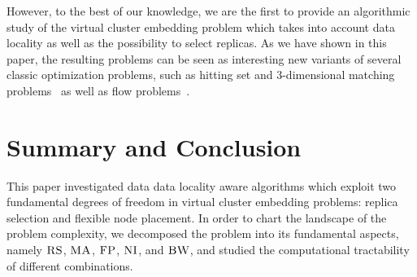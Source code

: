 \documentclass[9pt]{sigcomm-alternate}
\newcommand{\CC}{\textsc{NI}}
\newcommand{\FP}{\textsc{FP}}
\newcommand{\RS}{\textsc{RS}}
\newcommand{\BW}{\textsc{BW}}
\newcommand{\MA}{\textsc{MA}}
\begin{document}
However, to the best of our knowledge, we are the first to provide an algorithmic
study of the virtual cluster embedding problem which takes into account
data locality as well as the possibility to select replicas. As we have shown in this paper,
the resulting problems can be seen as interesting new variants of several classic optimization
problems, such as hitting set and 3-dimensional matching problems~\cite{3SC-hard} as well as flow problems~\cite{korte2002combinatorial}.

\section{Summary and Conclusion}\label{sec:conclusion}

This paper investigated data data locality aware algorithms which exploit two fundamental
degrees of freedom in virtual cluster
embedding problems: replica selection and flexible node placement. In order to
chart the landscape of the problem complexity, we
decomposed the problem into its fundamental aspects,
namely $\RS$, $\MA$, $\FP$, $\CC$, and $\BW$, and studied the computational
tractability of different combinations.
\end{document}
